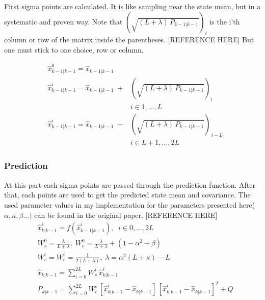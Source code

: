 \documentclass[peerreview]{IEEEtran}
\begin{document}
First sigma points are calculated. It is like sampling near the state mean, but in a systematic and proven way. Note that $ (\sqrt{(L+\lambda) \, P_{k-1|k-1}})_i $ is the i'th column or row of the matrix inside the parentheses. [REFERENCE HERE] But one must stick to one choice, row or column.

\begin{equation}
\begin{aligned}
&\hat{x}_{k-1|k-1}^0 = \hat{x}_{k-1|k-1} \\
&\hat{x}_{k-1|k-1}^i = \hat{x}_{k-1|k-1} \; + &(\sqrt{(L+\lambda) \, P_{k-1|k-1}})_i  \\
& &i\in 1,...,L\\
&\hat{x}_{k-1|k-1}^i = \hat{x}_{k-1|k-1} \; - &(\sqrt{(L+\lambda) \, P_{k-1|k-1}})_{\,i-L} \\
& &i\in L+1,...,2L 
\end{aligned}
\end{equation}

\subsubsection{Prediction}
At this part each sigma points are passed through the prediction function. After that, each points are used to get the predicted state mean and covariance. The used parameter values in my implementation for the parameters presented here($\alpha, \kappa, \beta ...)$ can be found in the original paper. [REFERENCE HERE]
\vspace{10px}
\begin{equation}
\begin{aligned}
&\hat{x}_{k|k-1}^i = f(\hat{x}_{k-1|k-1}^i),  \; \; i\in 0,...,2L\\
&W_s^0 = \frac{\lambda}{L + \lambda}, \; W_c^0 = \frac{\lambda}{L+\lambda} + (1-\alpha^2 + \beta)\\
&W_s^i = W_c^i = \frac{1}{2(L+\lambda)}, \; \lambda = \alpha^2 (L+\kappa) - L \\
&\hat{x}_{k|k-1} = \sum\limits_{i=0}^{2L} W_s^i \, \hat{x}_{k|k-1}^i \\
&P_{k|k-1} = \sum\limits_{i=0}^{2L} W_c^i \, [\hat{x}_{k|k-1}^i-\hat{x}_{k|k-1}]\,[\hat{x}_{k|k-1}^i-\hat{x}_{k|k-1}]^T + Q 
\end{aligned}
\end{equation}
\vspace{10px}
\end{document}
